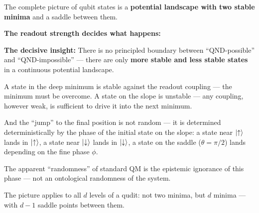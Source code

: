 \begin{foundation}
The complete picture of qubit states is a
\textbf{potential landscape with two stable minima}
and a saddle between them.

\textbf{The readout strength decides what happens:}

\begin{center}
{\footnotesize{}} %
\end{center}

\textbf{The decisive insight:}
There is no principled boundary between
``QND-possible'' and ``QND-impossible'' ---
there are only \textbf{more stable and less stable states}
in a continuous potential landscape.

A state in the deep minimum is stable against
the readout coupling --- the minimum must be overcome.
A state on the slope is unstable ---
any coupling, however weak, is sufficient to drive it
into the next minimum.

And the ``jump'' to the final position is not random ---
it is determined deterministically by the phase of the initial state
on the slope:
a state near $\left|\uparrow\right\rangle$ lands in $\left|\uparrow\right\rangle$,
a state near $\left|\downarrow\right\rangle$ lands in $\left|\downarrow\right\rangle$,
a state on the saddle ($\theta = \pi/2$) lands
depending on the fine phase $\phi$.

The apparent ``randomness'' of standard QM
is the epistemic ignorance of this phase ---
not an ontological randomness of the system.

The picture applies to all $d$ levels of a qudit:
not two minima, but $d$ minima ---
with $d-1$ saddle points between them.
\end{foundation}

